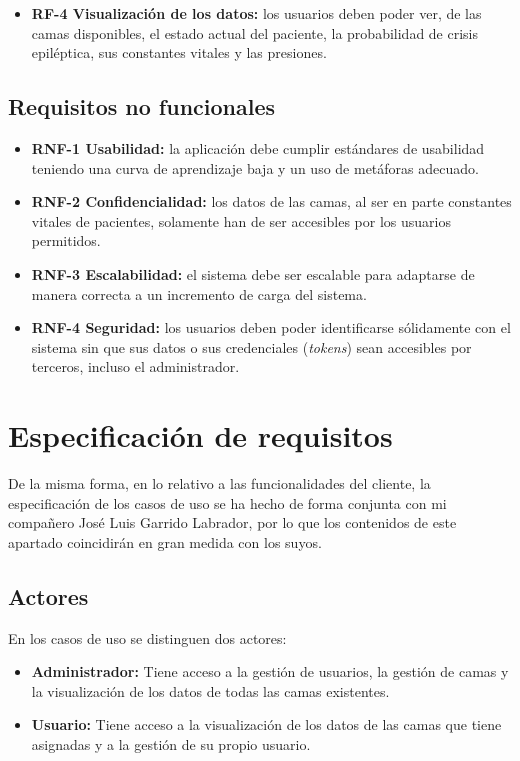 \begin{itemize}
	\item \textbf{RF-4 Visualización de los datos:} los usuarios deben poder ver, de las camas disponibles, el estado actual del paciente, la probabilidad de crisis epiléptica, sus constantes vitales y las presiones. 
	
\end{itemize}

\subsection{Requisitos no funcionales}

\begin{itemize}
	\item \textbf{RNF-1 Usabilidad:} la aplicación debe cumplir estándares de usabilidad teniendo una curva de aprendizaje baja y un uso de metáforas adecuado.
	\item \textbf{RNF-2 Confidencialidad:} los datos de las camas, al ser en parte constantes vitales de pacientes, solamente han de ser accesibles por los usuarios permitidos.
	\item \textbf{RNF-3 Escalabilidad:} el sistema debe ser escalable para adaptarse de manera correcta a un incremento de carga del sistema.
	\item \textbf{RNF-4 Seguridad:} los usuarios deben poder identificarse sólidamente con el sistema sin que sus datos o sus credenciales (\textit{tokens}) sean accesibles por terceros, incluso el administrador.
\end{itemize}


\section{Especificación de requisitos}

De la misma forma, en lo relativo a las funcionalidades del cliente, la especificación de los casos de uso se ha hecho de forma conjunta con mi compañero José Luis Garrido Labrador, por lo que los contenidos de este apartado coincidirán en gran medida con los suyos. 

\subsection{Actores}

En los casos de uso se distinguen dos actores: 
\begin{itemize}
	\item \textbf{Administrador:} Tiene acceso a la gestión de usuarios, la gestión de camas y la visualización de los datos de todas las camas existentes. 
	\item \textbf{Usuario:} Tiene acceso a la visualización de los datos de las camas que tiene asignadas y a la gestión de su propio usuario. 
\end{itemize}

